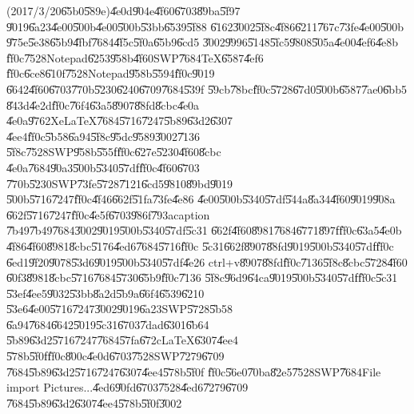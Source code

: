 (2017/3/20\U{65b0}\U{589e})\U{4e0d}\U{904e}\U{4f60}\U{6703}\U{89ba}\U{5f97}%
\U{9019}\U{6a23}\U{4e00}\U{500b}\U{4e00}\U{500b}\U{53bb}\U{6539}\U{5f88}%
\U{6162}\U{3002}\U{5f8c}\U{4f86}\U{6211}\U{767c}\U{73fe}\U{4e00}\U{500b}%
\U{975e}\U{5e38}\U{65b9}\U{4fbf}\U{7684}\U{4f5c}\U{5f0a}\U{65b9}\U{6cd5}%
\U{3002}\U{9996}\U{5148}\U{5fc5}\U{9808}\U{505a}\U{4e00}\U{4ef6}\U{4e8b}%
\U{ff0c}\U{7528}Notepad\U{6253}\U{958b}\U{4f60}SWP\U{7684}TeX\U{6587}\U{4ef6}%
\U{ff0c}\U{6ce8}\U{610f}\U{7528}Notepad\U{958b}\U{5594}\U{ff0c}\U{9019}%
\U{6642}\U{4f60}\U{6703}\U{770b}\U{5230}\U{6240}\U{6709}\U{7684}\U{539f}%
\U{59cb}\U{78bc}\U{ff0c}\U{5728}\U{67d0}\U{500b}\U{6587}\U{7ae0}\U{6bb5}%
\U{843d}\U{4e2d}\U{ff0c}\U{76f4}\U{63a5}\U{8907}\U{88fd}\U{8cbc}\U{4e0a}%
\U{4e0a}\U{9762}XeLaTeX\U{7684}\U{5716}\U{7247}\U{5b89}\U{63d2}\U{6307}%
\U{4ee4}\U{ff0c}\U{5b58}\U{6a94}\U{5f8c}\U{95dc}\U{9589}\U{3002}\U{7136}%
\U{5f8c}\U{7528}SWP\U{958b}\U{555f}\U{ff0c}\U{627e}\U{5230}\U{4f60}\U{8cbc}%
\U{4e0a}\U{7684}\U{90a3}\U{500b}\U{5340}\U{57df}\U{ff0c}\U{4f60}\U{6703}%
\U{770b}\U{5230}SWP\U{73fe}\U{5728}\U{7121}\U{6cd5}\U{9810}\U{89bd}\U{9019}%
\U{500b}\U{5716}\U{7247}\U{ff0c}\U{4f46}\U{662f}\U{51fa}\U{73fe}\U{4e86}%
\U{4e00}\U{500b}\U{5340}\U{57df}\U{544a}\U{8a34}\U{4f60}\U{9019}\U{908a}%
\U{662f}\U{5716}\U{7247}\U{ff0c}\U{4e5f}\U{6703}\U{986f}\U{793a}caption%
\U{7b49}\U{7b49}\U{7684}\U{3002}\U{9019}\U{500b}\U{5340}\U{57df}\U{5c31}%
\U{662f}\U{4f60}\U{8981}\U{7684}\U{6771}\U{897f}\U{ff0c}\U{63a5}\U{4e0b}%
\U{4f86}\U{4f60}\U{8981}\U{8cbc}\U{5176}\U{4ed6}\U{7684}\U{5716}\U{ff0c}%
\U{5c31}\U{662f}\U{8907}\U{88fd}\U{9019}\U{500b}\U{5340}\U{57df}\U{ff0c}%
\U{6ed1}\U{9f20}\U{9078}\U{53d6}\U{9019}\U{500b}\U{5340}\U{57df}\U{4e26}%
ctrl+v\U{8907}\U{88fd}\U{ff0c}\U{7136}\U{5f8c}\U{8cbc}\U{5728}\U{4f60}%
\U{60f3}\U{8981}\U{8cbc}\U{5716}\U{7684}\U{5730}\U{65b9}\U{ff0c}\U{7136}%
\U{5f8c}\U{96d9}\U{64ca}\U{9019}\U{500b}\U{5340}\U{57df}\U{ff0c}\U{5c31}%
\U{53ef}\U{4ee5}\U{9032}\U{53bb}\U{8a2d}\U{5b9a}\U{66f4}\U{6539}\U{6210}%
\U{53e6}\U{4e00}\U{5716}\U{7247}\U{3002}\U{9019}\U{6a23}SWP\U{5728}\U{5b58}%
\U{6a94}\U{7684}\U{6642}\U{5019}\U{5c31}\U{6703}\U{7dad}\U{6301}\U{6b64}%
\U{5b89}\U{63d2}\U{5716}\U{7247}\U{7684}\U{57fa}\U{672c}LaTeX\U{6307}\U{4ee4}%
\U{578b}\U{5f0f}\U{ff0c}\U{800c}\U{4e0d}\U{6703}\U{7528}SWP\U{7279}\U{6709}%
\U{7684}\U{5b89}\U{63d2}\U{5716}\U{7247}\U{6307}\U{4ee4}\U{578b}\U{5f0f}%
\U{ff0c}\U{56e0}\U{70ba}\U{82e5}\U{7528}SWP\U{7684}File \TEXTsymbol{>}
import Pictures...\U{4ed6}\U{90fd}\U{6703}\U{7528}\U{4ed6}\U{7279}\U{6709}%
\U{7684}\U{5b89}\U{63d2}\U{6307}\U{4ee4}\U{578b}\U{5f0f}\U{3002}

